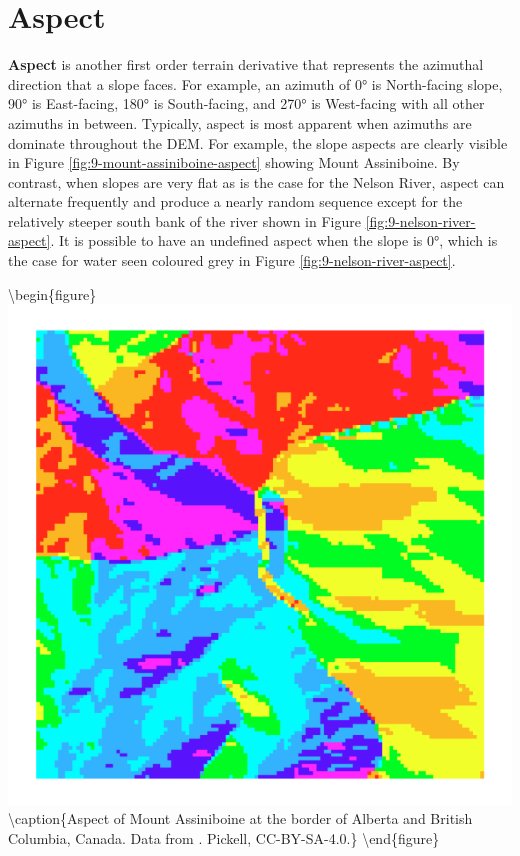 \documentclass[
]{book}
\begin{document}
\hypertarget{aspect}{%
\section{Aspect}\label{aspect}}

\textbf{Aspect} is another first order terrain derivative that represents the azimuthal direction that a slope faces. For example, an azimuth of 0° is North-facing slope, 90° is East-facing, 180° is South-facing, and 270° is West-facing with all other azimuths in between. Typically, aspect is most apparent when azimuths are dominate throughout the DEM. For example, the slope aspects are clearly visible in Figure \ref{fig:9-mount-assiniboine-aspect} showing Mount Assiniboine. By contrast, when slopes are very flat as is the case for the Nelson River, aspect can alternate frequently and produce a nearly random sequence except for the relatively steeper south bank of the river shown in Figure \ref{fig:9-nelson-river-aspect}. It is possible to have an undefined aspect when the slope is 0°, which is the case for water seen coloured grey in Figure \ref{fig:9-nelson-river-aspect}.

\textbackslash begin\{figure\}
\includegraphics[width=0.75\linewidth]{images/09-mount-assiniboine-aspect} \textbackslash caption\{Aspect of Mount Assiniboine at the border of Alberta and British Columbia, Canada. Data from \citet{natural_resources_canada_canadian_2015}. Pickell, CC-BY-SA-4.0.\}\label{fig:9-mount-assiniboine-aspect}
\textbackslash end\{figure\}
\end{document}
